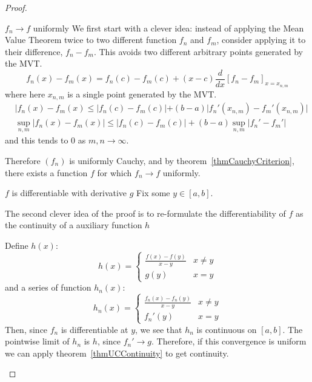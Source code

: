 \documentclass[../Main.tex]{subfiles}
\begin{document}
\begin{proof}
    \begin{subproof}{$f_n \to f$ uniformly}
        We first start with a clever idea: instead of applying the Mean Value Theorem twice to two different function $f_n$ and $f_m$, consider applying it to their difference, $f_n - f_m$. This avoids two different arbitrary points generated by the MVT.
        \begin{equation*}
            f_n(x) - f_m(x) = f_n(c) - f_m(c) + (x - c) \frac{d}{dx}\left[f_n - f_m\right]_{x = x_{n, m}}
        \end{equation*}
        where here $x_{n, m}$ is a single point generated by the MVT.
        \begin{align*}
            &|f_n(x) - f_m(x) \leq |f_n(c) - f_m(c)| + (b - a) |f_n'(x_{n, m}) - f_m'(x_{n, m})| \\
            &\sup_{n, m} |f_n(x) - f_m(x)| \leq |f_n(c) - f_m(c)| + (b-a) \sup_{n, m} |f_n' - f_m'|
        \end{align*}
        and this tends to $0$ as $m, n \to \infty$.

        Therefore $(f_n)$ is uniformly Cauchy, and by theorem~\ref{thmCauchyCriterion}, there exists a function $f$ for which $f_n \to f$ uniformly.
    \end{subproof}
    \begin{subproof}{$f$ is differentiable with derivative $g$}
        Fix some $y \in [a, b]$.
        
        The second clever idea of the proof is to re-formulate the differentiability of $f$ as the continuity of a auxiliary function $h$

        Define $h(x)$:
        \begin{equation*}
            h(x) =
            \begin{cases}
                \frac{f(x) - f(y)}{x - y} & x \neq y \\
                g(y) & x = y
            \end{cases}
        \end{equation*}
        and a series of function $h_n(x)$:
        \begin{equation*}
            h_n(x) =
            \begin{cases}
                \frac{f_n(x) - f_n(y)}{x - y} & x \neq y \\
                f_n'(y) & x = y
            \end{cases}
        \end{equation*}
        Then, since $f_n$ is differentiable at $y$, we see that $h_n$ is continuous on $[a, b]$.
        The pointwise limit of $h_n$ is $h$, since $f_n' \to g$. Therefore, if this convergence is uniform we can apply theorem~\ref{thmUCContinuity} to get continuity.


\end{subproof}
\end{proof}
\end{document}
